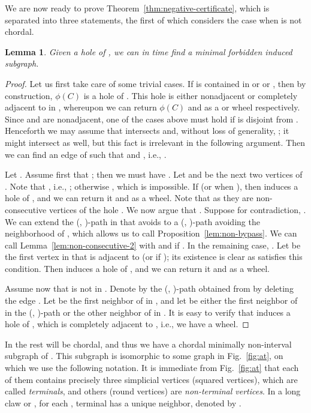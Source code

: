 \documentclass[10pt]{article}
\newtheorem{lemma}[theorem]{Lemma}
\newcommand{\badgraph}{minimal forbidden induced subgraph}
\newcommand{\stpath}[2]{(, )-path}
\newcommand{\og}[1]{\ensuremath{\phi(#1)}}
\begin{document}
We are now ready to prove Theorem~\ref{thm:negative-certificate}, which
is separated into three statements, the first of which considers the
case when  is not chordal.
\begin{lemma}\label{lem:hole}
  Given a hole  of , we can in  time find a
  \badgraph.
\end{lemma}
\begin{proof}
  Let us first take care of some trivial cases.  If  is contained
  in  or  or , then by construction, \og{C} is a
  hole of .  This hole is either nonadjacent or completely adjacent
  to  in , whereupon we can return \og{C} and  as a 
  or wheel respectively.  Since  and  are nonadjacent, one of
  the cases above must hold if  is disjoint from .
  Henceforth we may assume that  intersects  and,
  without loss of generality, ; it might intersect  as well, but
  this fact is irrelevant in the following argument.  Then we can find
  an edge  of  such that  and , i.e., .

  Let .  Assume first that ; then
  we must have .  Let  and  be the next two vertices
  of .  Note that , i.e., ;
  otherwise , which is impossible.  If  (or  when ), then
   induces a hole of , and
  we can return it and  as a wheel.  Note that  as they are non-consecutive vertices of the hole .  We now
  argue that .  Suppose for contradiction,
  .  We can extend the \stpath{x_3}{x_1}  in
   that avoids  to a \stpath{h^l_0}{h^r_0} avoiding the
  neighborhood of , which allows us to call
  Proposition~\ref{lem:non-bypass}.  We can call
  Lemma~\ref{lem:non-consecutive-2} with  and  if
  .  In the remaining case, .  Let  be the first vertex in  that is adjacent to
   (or  if ); its existence is clear as
   satisfies this condition.  Then  induces a hole of , and we can return it and
   as a wheel.

  Assume now that  is not in .  Denote by  the
  \stpath{x_2}{x_1} obtained from  by deleting the edge .
  Let  be the first neighbor of  in , and let  be
  either the first neighbor of  in the \stpath{x}{x_1} or the
  other neighbor of  in .  It is easy to verify that
   induces a hole of ,
  which is completely adjacent to , i.e., we have a wheel.
\end{proof}

In the rest  will be chordal, and thus we have a chordal
minimally non-interval subgraph  of .  This subgraph is
isomorphic to some graph in Fig.~\ref{fig:at}, on which we use the
following notation.  It is immediate from Fig.~\ref{fig:at} that each
of them contains precisely three simplicial vertices (squared
vertices), which are called \emph{terminals}, and others (round
vertices) are \emph{non-terminal vertices}.  In a long claw or \dag,
for each , terminal  has a unique neighbor, denoted by
.
\end{document}
